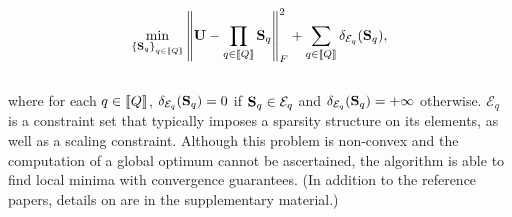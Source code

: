 \begin{align}
\label{eq:palm4msa}
\min_{\left \lbrace{\mathbf{S}}_q\right \rbrace_{q\in\left \llbracket Q\right \rrbracket}} \left \|{\mathbf{U}} -  \prod_{q\in\left \llbracket Q\right \rrbracket}{{\mathbf{S}}_q}\right \|_F^2 + \sum_{q\in\left \llbracket Q\right \rrbracket} \delta_{\mathcal{E}_q}({\mathbf{S}}_q),
\end{align}
~\\
where for each $q\in\left \llbracket Q\right \rrbracket$, $\delta_{\mathcal{E}_q}({\mathbf{S}}_q)=0$ 
if ${\mathbf{S}}_q \in \mathcal{E}_q$ and $\delta_{\mathcal{E}_q}({\mathbf{S}}_q)=+\infty$ otherwise. $\mathcal{E}_q$ is a constraint set that typically imposes a sparsity structure on its elements, as well as a scaling constraint. 
Although this problem is non-convex and the computation of a global optimum cannot be
ascertained, the \palm algorithm is able to find %
local minima with convergence guarantees. 
(In addition to the reference papers, details on \palm are in the supplementary material.)



